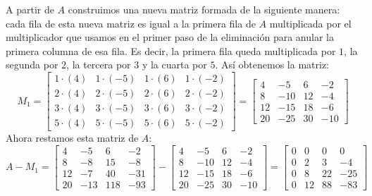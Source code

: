 A partir de $A$ construimos una nueva matriz formada de la siguiente manera: cada fila de esta nueva matriz es igual a la primera fila de $A$ multiplicada por el multiplicador que usamos en el primer paso de la eliminación para anular la primera columna de esa fila. Es decir, la primera fila queda multiplicada por $1$, la segunda por $2$, la tercera por $3$ y la cuarta por $5$. Así obtenemos la matriz:
\[
M_1 = \begin{bmatrix}
1 \cdot (4) & 1 \cdot (-5) & 1 \cdot (6) & 1 \cdot (-2) \\
2 \cdot (4) & 2 \cdot (-5) & 2 \cdot (6) & 2 \cdot (-2) \\
3 \cdot (4) & 3 \cdot (-5) & 3 \cdot (6) & 3 \cdot (-2) \\
5 \cdot (4) & 5 \cdot (-5) & 5 \cdot (6) & 5 \cdot (-2)
\end{bmatrix}
=
\begin{bmatrix}
4 & -5 &  6 & -2 \\
8 & -10 & 12 & -4 \\
12 & -15 & 18 & -6 \\
20 & -25 & 30 & -10
\end{bmatrix}
\]
Ahora restamos esta matriz de $A$:
\[
A - M_1 =
\begin{bmatrix}
4 & -5 &  6 & -2 \\
8 & -8 & 15 & -8 \\
12 & -7 & 40 & -31 \\
20 & -13 & 118 & -93
\end{bmatrix}
-
\begin{bmatrix}
4 & -5 &  6 & -2 \\
8 & -10 & 12 & -4 \\
12 & -15 & 18 & -6 \\
20 & -25 & 30 & -10
\end{bmatrix}
=
\begin{bmatrix}
0 & 0 &  0 &  0 \\
0 & 2 &  3 & -4 \\
0 & 8 & 22 & -25 \\
0 & 12 & 88 & -83
\end{bmatrix}
\]

